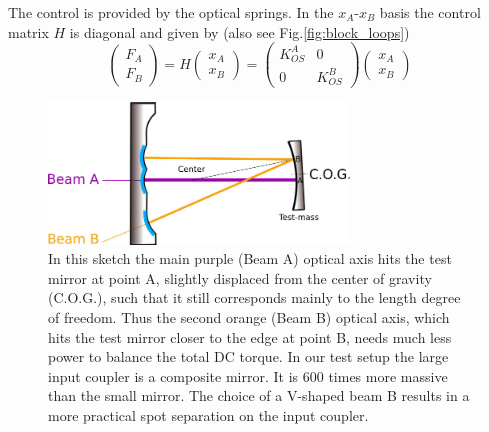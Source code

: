 The control is provided by the optical springs. In the $x_A$-$x_B$ basis the control matrix $H$ is diagonal and given by  (also see Fig.\ref{fig:block_loops})
\begin{equation}
\begin{pmatrix}
F_{A}\\ F_{B}
\end{pmatrix}
= H
 \begin{pmatrix}
x_A\\ x_B
\end{pmatrix} 
=  \begin{pmatrix}
K_{OS}^A & 0 \\ 0 & K_{OS}^B
\end{pmatrix} 
 \begin{pmatrix}
x_A\\ x_B
\end{pmatrix} 
\label{eq:HX}
\end{equation}

\begin{figure}[t]
	\centering
		\includegraphics[width=8cm]{./figures/trap_drawing_paper2.pdf}
	\caption[Angular Trap Sketch]{
	In this sketch the main purple (Beam A) optical axis hits the test mirror %
	at point A, slightly displaced from the center of gravity (C.O.G.), such
	 that it still corresponds mainly to the length degree of freedom. Thus the second orange (Beam B) optical axis, which hits the test mirror closer to the edge at point B, needs much less power to balance the total DC torque. In our test setup the large input coupler is a composite mirror. It is 600 times more massive than the small mirror. The choice of a V-shaped beam B results in a more practical spot separation on the input coupler. }	


	
	\label{fig:angular}
\end{figure}



